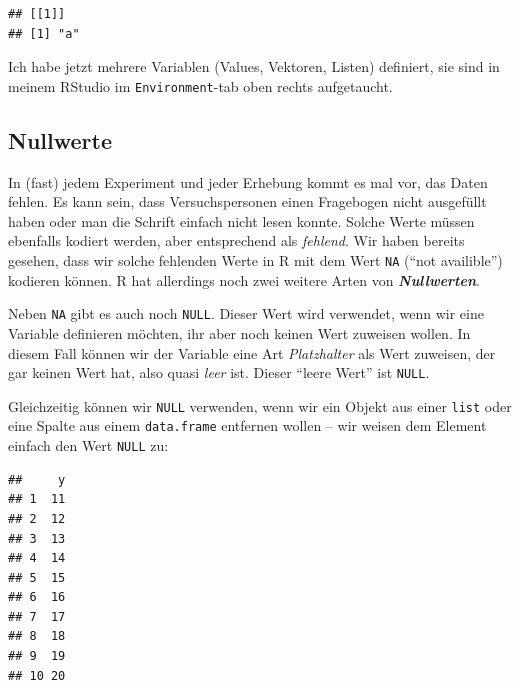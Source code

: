 \documentclass[
  ngerman,
]{book}
\newenvironment{Shaded}{\begin{snugshade}}{\end{snugshade}}
\newcommand{\ConstantTok}[1]{\textcolor[rgb]{0.56,0.35,0.01}{#1}}
\newcommand{\DecValTok}[1]{\textcolor[rgb]{0.00,0.00,0.81}{#1}}
\newcommand{\FunctionTok}[1]{\textcolor[rgb]{0.13,0.29,0.53}{\textbf{#1}}}
\newcommand{\NormalTok}[1]{#1}
\newcommand{\OtherTok}[1]{\textcolor[rgb]{0.56,0.35,0.01}{#1}}
\newcommand{\SpecialCharTok}[1]{\textcolor[rgb]{0.81,0.36,0.00}{\textbf{#1}}}
\newcommand{\StringTok}[1]{\textcolor[rgb]{0.31,0.60,0.02}{#1}}
\begin{document}
\begin{verbatim}
## [[1]]
## [1] "a"
\end{verbatim}

Ich habe jetzt mehrere Variablen (Values, Vektoren, Listen) definiert, sie sind in meinem RStudio im \texttt{Environment}-tab oben rechts aufgetaucht.

\subsection{Nullwerte}\label{nullwerte}

In (fast) jedem Experiment und jeder Erhebung kommt es mal vor, das Daten fehlen. Es kann sein, dass Versuchspersonen einen Fragebogen nicht ausgefüllt haben oder man die Schrift einfach nicht lesen konnte. Solche Werte müssen ebenfalls kodiert werden, aber entsprechend als \emph{fehlend}. Wir haben bereits gesehen, dass wir solche fehlenden Werte in R mit dem Wert \texttt{NA} (``not availible'') kodieren können. R hat allerdings noch zwei weitere Arten von \textbf{\emph{Nullwerten}}.

Neben \texttt{NA} gibt es auch noch \texttt{NULL}. Dieser Wert wird verwendet, wenn wir eine Variable definieren möchten, ihr aber noch keinen Wert zuweisen wollen. In diesem Fall können wir der Variable eine Art \emph{Platzhalter} als Wert zuweisen, der gar keinen Wert hat, also quasi \emph{leer} ist. Dieser ``leere Wert'' ist \texttt{NULL}.

Gleichzeitig können wir \texttt{NULL} verwenden, wenn wir ein Objekt aus einer \texttt{list} oder eine Spalte aus einem \texttt{data.frame} entfernen wollen -- wir weisen dem Element einfach den Wert \texttt{NULL} zu:

\begin{Shaded}
\end{Shaded}

\begin{verbatim}
##     y
## 1  11
## 2  12
## 3  13
## 4  14
## 5  15
## 6  16
## 7  17
## 8  18
## 9  19
## 10 20
\end{verbatim}
\end{document}
